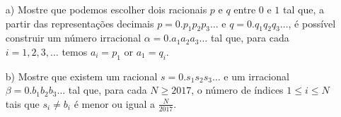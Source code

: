 \begin{itemize}
\item[a)] Mostre que podemos escolher dois racionais $p$ e $q$ entre $0$ e $1$ tal que, a partir das representações decimais $p = 0.p_1p_2p_3\dots$ e $q = 0.q_1q_2q_3\dots$, é possível construir um número irracional $\alpha = 0.a_1a_2a_3\dots$ tal que, para cada $i = 1, 2, 3, \dots$ temos $a_i = p_1$ or $a_1 = q_i$.

\item[b)] Mostre que existem um racional $s = 0.s_1s_2s_3\dots$ e um irracional $\beta = 0.b_1b_2b_3\dots$ tal que, para cada $N \geq 2017$, o número de índices $1 \leq i \leq N$ tais que $s_i \neq b_i$ é menor ou igual a $\frac{N}{2017}$.
\end{itemize}